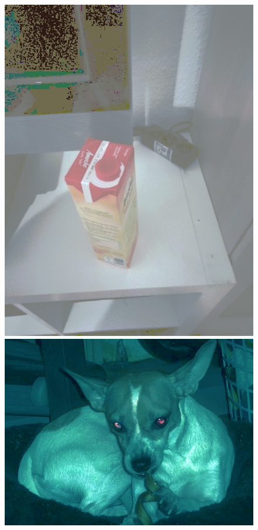 \begin{appendices}
\begin{figure}[htb]
\begin{minipage}{0.19\textwidth}
\includegraphics[width=\textwidth]{images/anomalien/HS/IMG_20181209_160802.jpg}
\end{minipage}
\begin{minipage}{\textwidth}
\hspace{\textwidth}
\end{minipage}
\begin{minipage}{0.19\textwidth}
\includegraphics[width=\textwidth]{images/anomalien/HS/n02085620_1620.jpg}

\end{minipage}
\end{figure}
\end{appendices}
